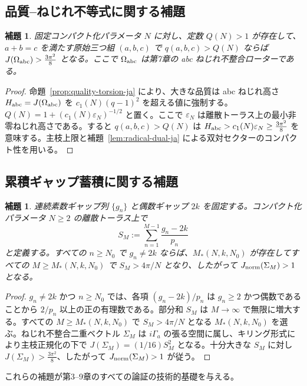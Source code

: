 \documentclass[dvipdfmx,a4paper]{article}
\newtheorem{lemma}[theorem]{補題}
\theoremstyle{definition}
\theoremstyle{remark}
\newcommand{\Jnorm}{J_{\rm norm}}
\newcommand{\Jbound}{\frac{3\pi^2}{8}}
\begin{document}
\subsection{品質--ねじれ不等式に関する補題}
\label{lem:quality-torsion-ja}

\begin{lemma}
固定コンパクト化パラメータ $N$ に対し、定数 $Q(N) > 1$ が存在して、$a + b = c$ を満たす原始三つ組 $(a,b,c)$ で $q(a,b,c) > Q(N)$ ならば $J(\Omega_{\rm abc}) > \Jbound$ となる。ここで $\Omega_{\rm abc}$ は第7章の abc ねじれ不整合ローターである。
\end{lemma}

\begin{proof}
命題~\ref{prop:quality-torsion-ja} により、大きな品質は abc ねじれ高さ $H_{\rm abc} = J(\Omega_{\rm abc})$ を $c_1(N)(q - 1)^2$ を超える値に強制する。$Q(N) = 1 + (c_1(N) \varepsilon_N)^{-1/2}$ と置く。ここで $\varepsilon_N$ は離散トーラス上の最小非零ねじれ高さである。すると $q(a,b,c) > Q(N)$ は $H_{\rm abc} > c_1(N) \varepsilon_N \geq \Jbound$ を意味する。主枝上限と補題~\ref{lem:radical-dual-ja} による双対セクターのコンパクト性を用いる。
\end{proof}

\subsection{累積ギャップ蓄積に関する補題}
\label{lem:gap-accumulation-ja}

\begin{lemma}
連続素数ギャップ列 $\{g_n\}$ と偶数ギャップ $2k$ を固定する。コンパクト化パラメータ $N \geq 2$ の離散トーラス上で
\[
S_M := \sum_{n=1}^{M-1} \frac{g_n - 2k}{p_n}
\]
と定義する。すべての $n \geq N_0$ で $g_n \neq 2k$ ならば、$M_*(N,k,N_0)$ が存在してすべての $M \geq M_*(N,k,N_0)$ で $S_M > 4\pi/N$ となり、したがって $\Jnorm(\Sigma_M) > 1$ となる。
\end{lemma}

\begin{proof}
$g_n \neq 2k$ かつ $n \geq N_0$ では、各項 $(g_n - 2k)/p_n$ は $g_n \geq 2$ かつ偶数であることから $2/p_n$ 以上の正の有理数である。部分和 $S_M$ は $M \to \infty$ で無限に増大する。すべての $M \geq M_*(N,k,N_0)$ で $S_M > 4\pi/N$ となる $M_*(N,k,N_0)$ を選ぶ。ねじれ不整合二重ベクトル $\Sigma_M$ は $i\Gamma_a$ の張る空間に属し、キリング形式により主枝正規化の下で $J(\Sigma_M) = (1/16) S_M^2$ となる。十分大きな $S_M$ に対し $J(\Sigma_M) > \Jbound$、したがって $\Jnorm(\Sigma_M) > 1$ が従う。
\end{proof}

これらの補題が第3--9章のすべての論証の技術的基礎を与える。
\end{document}
